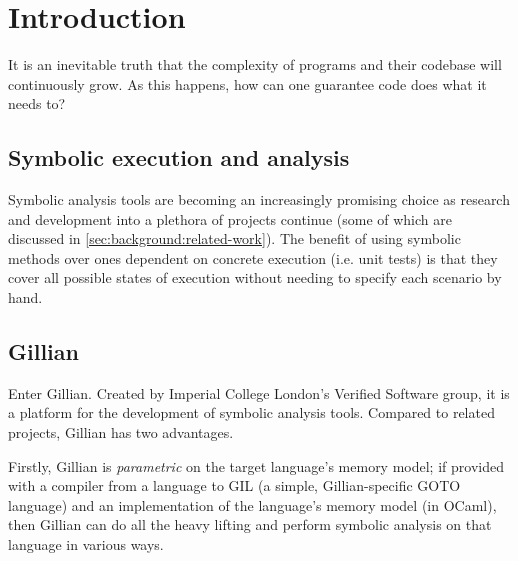 \chapter{Introduction}
\label{sec:intro}




It is an inevitable truth that the complexity of programs and their codebase
will continuously grow. As this happens, how can one guarantee code does what
it needs to?

\section{Symbolic execution and analysis}

Symbolic analysis tools are becoming an increasingly promising choice as
research and development into a plethora of projects continue (some of which
are discussed in \autoref{sec:background:related-work}). The benefit of using
symbolic methods over ones dependent on concrete execution (i.e. unit tests) is
that they cover all possible states of execution without needing to specify each
scenario by hand.


\section{Gillian}
Enter Gillian. Created by Imperial College London's Verified Software group, it
is a platform for the development of symbolic analysis tools. Compared to
related projects, Gillian has two advantages.

Firstly, Gillian is \textit{parametric} on the target language's memory model;
if provided with a compiler from a language to GIL (a simple, Gillian-specific
GOTO language) and an implementation of the language's memory model (in OCaml),
then Gillian can do all the heavy lifting and perform symbolic analysis on that
language in various ways\cite{gillian-part1}.

